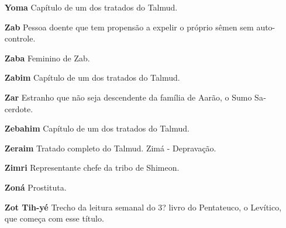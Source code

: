 \begin{itemize}
\item[\textbf{Yoma}] Capítulo de um dos tratados do Talmud.

\item[\textbf{Zab}] Pessoa doente que tem propen­são a expelir o próprio
sêmen sem au­to-controle.

\item[\textbf{Zaba}] Feminino de Zab.

\item[\textbf{Zabim}] Capítulo de um dos tratados do Talmud.

\item[\textbf{Zar}] Estranho que não seja descen­dente da família de Aarão, o
Sumo Sa­cerdote.

\item[\textbf{Zebahim}] Capítulo de um dos trata­dos do Talmud.

\item[\textbf{Zeraim}] Tratado completo do Talmud. Zimá - Depravação.

\item[\textbf{Zimri}] Representante chefe da tribo de Shimeon.

\item[\textbf{Zoná}] Prostituta.

\item[\textbf{Zot Tih-yé}] Trecho da leitura sema­nal do 3? livro do
Pentateuco, o Leví­tico, que começa com esse título.
\end{itemize}
\endgroup %
